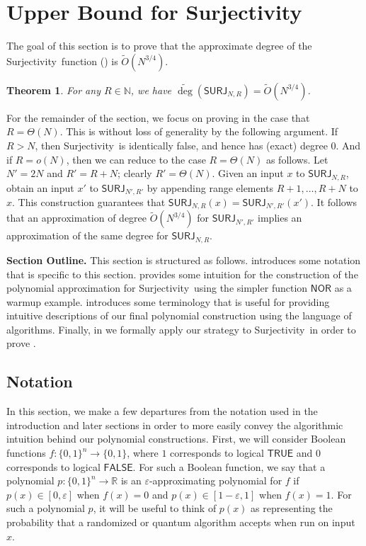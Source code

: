 \documentclass[11pt, letterpaper, fleqn]{article}
\newtheorem{theorem}{Theorem}
\theoremstyle{plain}
\newcommand{\R}{\mathbb{R}}
\newcommand{\SURJ}{\mathsf{ SURJ}}
\newcommand{\Surjectivity}{Surjectivity}
\newcommand{\NOR}{\mathsf{ NOR}}
\newcommand{\B}{\{0,1\}}
\newcommand{\tO}{\tilde{O}}
\newcommand{\eps}{\varepsilon}
\newcommand{\adeg}{\widetilde{\operatorname{deg}}}
\begin{document}
 
\section{Upper Bound for Surjectivity}
\label{s:upper}
The goal of this section is to prove that the approximate degree of the \Surjectivity\ function () is $\tO(N^{3/4})$.
\begin{theorem}
\label{thm:surj_upper} \label{thm:upper}
For any $R \in \mathbb{N}$, we have $\adeg(\SURJ_{N,R}) = \tO(N^{3/4})$.
\end{theorem}

For the remainder of the section, we focus on proving  in the case that $R=\Theta(N)$. This is without loss of generality by the following argument. 
If $R > N$, then 
\Surjectivity\ is identically false, and hence has (exact) degree 0. 
And if $R=o(N)$, then we can reduce to the case $R=\Theta(N)$ as follows. Let $N'=2N$ and $R' = R + N$;
clearly $R' = \Theta(N)$.
Given an input $x$ to $\SURJ_{N, R}$, obtain an input $x'$ to $\SURJ_{N', R'}$ by appending range elements $R+1, \dots, R+N$ to $x$. 
This construction guarantees that $\SURJ_{N, R}(x) = \SURJ_{N', R'}(x')$. It follows that an approximation of degree $\tilde{O}(N^{3/4})$ for $\SURJ_{N', R'}$
implies an approximation of the same degree for $\SURJ_{N, R}$. 



\medskip \noindent \textbf{Section Outline.} This section is structured as follows. 
 introduces some notation that is specific to this section.
 provides some intuition for the construction of the polynomial approximation for \Surjectivity\ using the simpler function $\NOR$ as a warmup example. 
 introduces some terminology that is useful for providing intuitive descriptions of our final polynomial construction using the language of algorithms. Finally, in  we formally apply our strategy to \Surjectivity\ in order to prove .


\subsection{Notation}
\label{specialnotation}
In this section, we make a few departures from the notation used in the introduction and later sections in order to more easily convey the algorithmic intuition behind our polynomial constructions. First, we will consider Boolean functions $f : \B^n \to \B$, where $1$ corresponds to logical $\mathsf{TRUE}$ and $0$ corresponds to logical $\mathsf{FALSE}$. For such a Boolean function, we say that a polynomial $p : \B^n \to \R$ is an $\eps$-approximating polynomial for $f$ if $p(x) \in [0, \eps]$ when $f(x) = 0$ and $p(x) \in [1-\eps, 1]$ when $f(x) = 1$. 
For such a polynomial $p$, it will be useful to think of $p(x)$ as representing 
the probability that a randomized or quantum algorithm accepts when run on input $x$.
\end{document}
